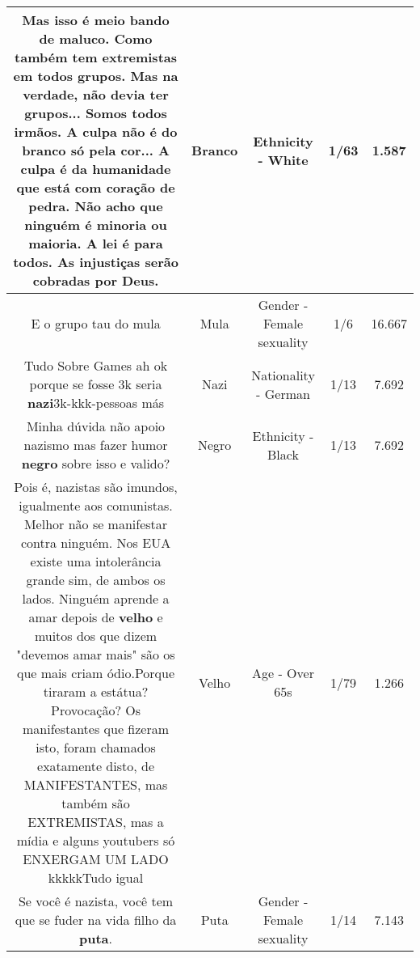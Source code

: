 \documentclass[11pt]{article}
\newlength\mylength
\begin{document}
\begin{center}
\begin{longtable}{|C{.65\mylength}|C{.30\mylength}|C{.12\mylength}|C{.12\mylength}|C{.12\mylength}|}
  \small Mas isso é meio bando de maluco. Como também tem extremistas em todos grupos. Mas na verdade, não devia ter grupos... Somos todos irmãos. A culpa não é do \textbf{branco} só pela cor... A culpa é da humanidade que está com coração de pedra. Não acho que ninguém é minoria ou maioria. A lei é para todos. As injustiças serão cobradas por Deus.\normalsize   & Branco & Ethnicity - White & 1/63 & 1.587 \\  \hline
  \small E o grupo tau do mula\normalsize   & Mula & Gender - Female sexuality & 1/6 & 16.667 \\  \hline
  \small Tudo Sobre Games ah ok porque se fosse 3k seria \textbf{nazi}3k-kkk-pessoas más\normalsize   & Nazi & Nationality - German & 1/13 & 7.692 \\  \hline
  \small Minha dúvida não apoio nazismo mas fazer humor \textbf{negro} sobre isso e valido?\normalsize   & Negro & Ethnicity - Black & 1/13 & 7.692 \\  \hline
  \small Pois é, nazistas são imundos, igualmente aos comunistas. Melhor não se manifestar contra ninguém. Nos EUA existe uma intolerância grande sim, de ambos os lados. Ninguém aprende a amar depois de \textbf{velho} e muitos dos que dizem "devemos amar mais" são os que mais criam ódio.Porque tiraram a estátua? Provocação?  Os manifestantes que fizeram isto, foram chamados exatamente disto, de MANIFESTANTES, mas também são EXTREMISTAS, mas a mídia e alguns youtubers só ENXERGAM UM LADO kkkkkTudo igual\normalsize   & Velho & Age - Over 65s & 1/79 & 1.266 \\  \hline
  \small Se você é nazista, você tem que se fuder na vida filho da \textbf{puta}.\normalsize   & Puta & Gender - Female sexuality & 1/14 & 7.143 \\  \hline

\end{longtable}
\end{center}
\end{document}
